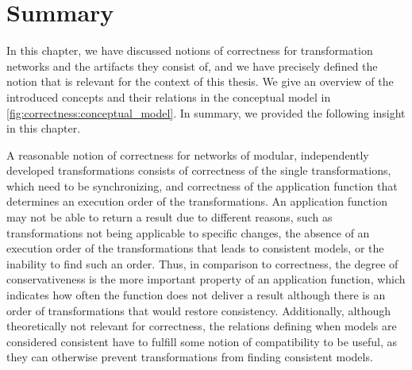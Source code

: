 \section{Summary}
\label{chap:correctness:summary}


In this chapter, we have discussed notions of correctness for transformation networks and the artifacts they consist of, and we have precisely defined the notion that is relevant for the context of this thesis.
We give an overview of the introduced concepts and their relations in the conceptual model in \autoref{fig:correctness:conceptual_model}.
In summary, we provided the following insight in this chapter.

\begin{insight}
    A reasonable notion of correctness for networks of modular, independently developed transformations consists of correctness of the single transformations, which need to be synchronizing, and correctness of the application function that determines an execution order of the transformations.
    An application function may not be able to return a result due to different reasons, such as transformations not being applicable to specific changes, the absence of an execution order of the transformations that leads to consistent models, or the inability to find such an order.
    Thus, in comparison to correctness, the degree of conservativeness is the more important property of an application function, which indicates how often the function does not deliver a result although there is an order of transformations that would restore consistency.
    Additionally, although theoretically not relevant for correctness, the relations defining when models are considered consistent have to fulfill some notion of compatibility to be useful, as they can otherwise prevent transformations from finding consistent models.
\end{insight}

